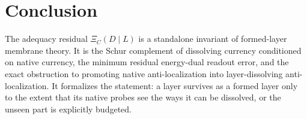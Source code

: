 \documentclass[11pt]{article}
\begin{document}
\section{Conclusion}

The adequacy residual \(\Xi_C(D\mid L)\) is a standalone invariant of formed-layer membrane theory.  It is the Schur complement of dissolving currency conditioned on native currency, the minimum residual energy-dual readout error, and the exact obstruction to promoting native anti-localization into layer-dissolving anti-localization.  It formalizes the statement: a layer survives as a formed layer only to the extent that its native probes see the ways it can be dissolved, or the unseen part is explicitly budgeted.
\end{document}
